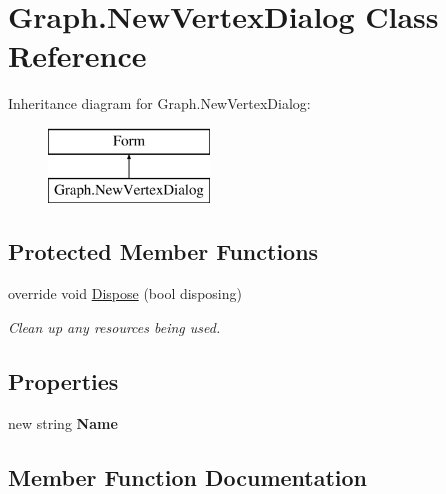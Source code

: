 \hypertarget{class_graph_1_1_new_vertex_dialog}{}\section{Graph.\+New\+Vertex\+Dialog Class Reference}
\label{class_graph_1_1_new_vertex_dialog}
Inheritance diagram for Graph.\+New\+Vertex\+Dialog\+:\begin{figure}[H]
\begin{center}
\leavevmode
\includegraphics[height=2.000000cm]{class_graph_1_1_new_vertex_dialog}
\end{center}
\end{figure}
\subsection*{Protected Member Functions}
\begin{DoxyCompactItemize}
\item 
override void \hyperlink{class_graph_1_1_new_vertex_dialog_a92dfc769811c7d1832117f8c7054b564}{Dispose} (bool disposing)
\begin{DoxyCompactList}\small\item\em Clean up any resources being used. \end{DoxyCompactList}\end{DoxyCompactItemize}
\subsection*{Properties}
\begin{DoxyCompactItemize}
\item 
\mbox{\label{class_graph_1_1_new_vertex_dialog_ae24171e3e7f7b248dd9e2efeb41f7f7c}} 
new string {\bfseries Name}
\end{DoxyCompactItemize}


\subsection{Member Function Documentation}
\mbox{\label{class_graph_1_1_new_vertex_dialog_a92dfc769811c7d1832117f8c7054b564}} 
